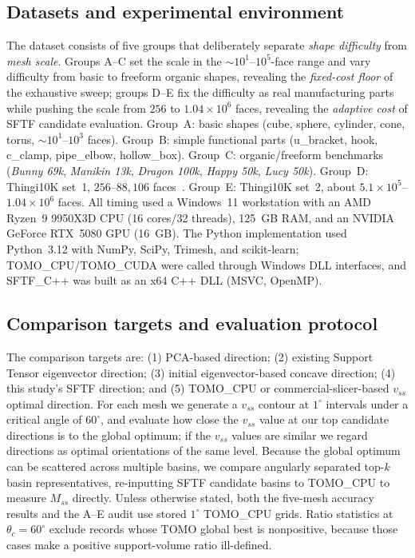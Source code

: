 \documentclass[12pt]{article}
\begin{document}
\subsection{Datasets and experimental environment}
\label{sec:datasets}
The dataset consists of five groups that deliberately separate \emph{shape
difficulty} from \emph{mesh scale}. Groups A--C set the scale in the
$\sim$$10^1$--$10^5$-face range and vary difficulty from basic to freeform organic
shapes, revealing the \emph{fixed-cost floor} of the exhaustive sweep; groups D--E
fix the difficulty as real manufacturing parts while pushing the scale from $256$ to
$1.04\times10^6$ faces, revealing the \emph{adaptive cost} of SFTF candidate
evaluation. Group~A: basic shapes (cube, sphere, cylinder, cone, torus, $\sim$$10^1$--$10^3$
faces). Group~B: simple functional parts (u\_bracket, hook, c\_clamp, pipe\_elbow,
hollow\_box). Group~C: organic/freeform benchmarks (\emph{Bunny 69k}, \emph{Manikin
13k}, \emph{Dragon 100k}, \emph{Happy 50k}, \emph{Lucy 50k}). Group~D: Thingi10K set~1,
$256$--$88{,}106$ faces~\cite{Thingi10K}. Group~E: Thingi10K set~2, about
$5.1\times10^5$--$1.04\times10^6$ faces. All timing used a Windows~11 workstation with
an AMD Ryzen~9 9950X3D CPU (16 cores/32 threads), 125~GB RAM, and an NVIDIA GeForce
RTX~5080 GPU (16~GB). The Python implementation used Python~3.12 with NumPy, SciPy,
Trimesh, and scikit-learn; TOMO\_CPU/TOMO\_CUDA were called through Windows DLL
interfaces, and SFTF\_C++ was built as an x64 C++ DLL (MSVC, OpenMP).

\subsection{Comparison targets and evaluation protocol}
\label{sec:protocol}
The comparison targets are: (1) PCA-based direction; (2) existing Support Tensor
eigenvector direction; (3) initial eigenvector-based concave direction; (4) this
study's SFTF direction; and (5) TOMO\_CPU or commercial-slicer-based $v_{ss}$ optimal
direction. For each mesh we generate a $v_{ss}$ contour at $1^\circ$ intervals under a
critical angle of $60^\circ$, and evaluate how close the $v_{ss}$ value at our top
candidate directions is to the global optimum; if the $v_{ss}$ values are similar we
regard directions as optimal orientations of the same level. Because the global
optimum can be scattered across multiple basins, we compare angularly separated
top-$k$ basin representatives, re-inputting SFTF candidate basins to TOMO\_CPU to
measure $M_{ss}$ directly. Unless otherwise stated, both the five-mesh accuracy
results and the A--E audit use stored $1^\circ$ TOMO\_CPU grids. Ratio statistics at
$\theta_c=60^\circ$ exclude records whose TOMO global best is nonpositive, because
those cases make a positive support-volume ratio ill-defined.
\end{document}
